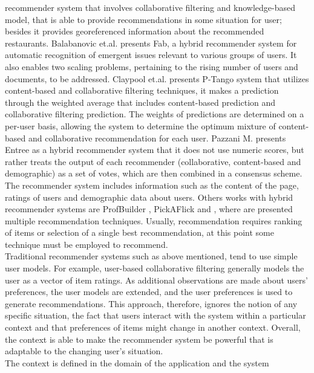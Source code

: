 recommender system that involves collaborative filtering and
knowledge-based model, that is able to provide recommendations in some
situation for user; besides it provides georeferenced information
about the recommended restaurants.
Balabanovic et.al.\cite{balabanovic1997fab} presents
Fab, a hybrid recommender system for automatic recognition of
emergent issues relevant to various groups of users. It also enables
two scaling problems, pertaining to the rising number of users and
documents, to be addressed. Claypool et.al.\cite{claypool1999combining} 
presents P-Tango system that utilizes content-based and collaborative
filtering techniques, it makes a prediction through the weighted
average that includes content-based prediction and collaborative
filtering prediction. The weights of predictions are determined on a
per-user basis, allowing the system to determine the optimum mixture
of content-based and collaborative recommendation for each user.
Pazzani M.\cite{pazzani1999framework} presents Entree as a hybrid
recommender system that it does not use numeric scores, but rather
treats the output of each recommender (collaborative, content-based
and demographic) as a set of votes, which are then combined in a
consensus scheme. The recommender system includes information such as
the content of the page, ratings of users and demographic data about
users. 
Others works with hybrid recommender systems are ProfBuilder
\cite{al1999semantic}, PickAFlick\cite{burke1999integrating}  and
\cite{tran2000hybrid}, where are presented multiple recommendation
techniques. Usually, recommendation requires ranking of
items or selection of a single best recommendation, at this point some
technique must be employed to recommend. \\ 
Traditional recommender systems such as above mentioned, tend to use
simple user models. For example, user-based collaborative filtering
generally models the user as a vector of item ratings. As additional
observations are made about users’ preferences, the user models are
extended, and the user preferences is used to generate
recommendations. This approach, therefore, ignores the notion of any
specific situation, the fact that users interact with the system
within a particular context and  that preferences of items might 
change in another context. 
Overall, the context is able to make the recommender system be 
powerful that is adaptable to the changing user's situation.\\
The context is defined in the domain of the application and the system
